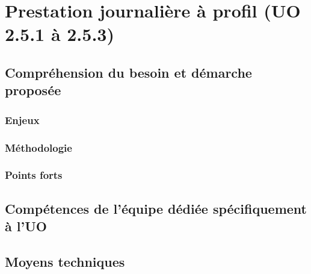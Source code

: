 	\section{Prestation journalière à profil (UO 2.5.1 à 2.5.3)}
		\subsection{Compréhension du besoin et démarche proposée}
		\subsubsection{Enjeux}
		\subsubsection{Méthodologie}
		\subsubsection{Points forts}
		\subsection{Compétences de l'équipe dédiée spécifiquement à l'UO}	
		\subsection{Moyens techniques}